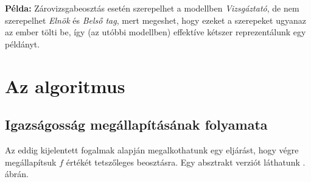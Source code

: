 \documentclass[twocolumn]{article}
\theoremstyle{definition}
\newcommand{\pl}{ \textbf{Példa:} }
\begin{document}
    \pl Zárovizsgabeosztás esetén szerepelhet a modellben \textit{Vizsgáztató}, de nem szerepelhet \textit{Elnök} és \textit{Belső tag}, mert megeshet, hogy ezeket a szerepeket ugyanaz az ember tölti be, így (az utóbbi modellben) effektíve kétszer reprezentálunk egy példányt.

\section{Az algoritmus}
    \subsection{Igazságosság megállapításának folyamata}
    
    Az eddig kijelentett fogalmak alapján megalkothatunk egy eljárást, hogy végre megállapítsuk $f$ értékét tetszőleges beosztásra. Egy absztrakt verziót láthatunk \az{\ref{fig:flow}}. ábrán.
    
\end{document}
